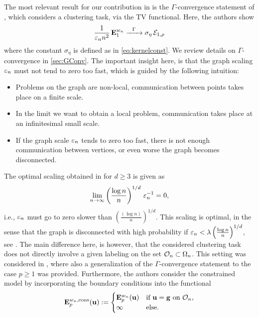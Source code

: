 The most relevant result for our contribution in \cite{roith2022continuum} is the $\Gamma$-convergence statement of \cite{GarcSlep15}, which considers a clustering task, via the TV functional. Here, the authors show 
%
\begin{align*}
\frac{1}{\varepsilon_n n^2}\, \mathbf{E}^{w_n}_1 \xrightarrow{\phantom{-}\Gamma\phantom{-}} \sigma_\eta\, \mathcal{E}_{1,\rho}
\end{align*}
%
where the constant $\sigma_\eta$ is defined as in \cref{eq:kernelconst}. We review details on $\Gamma$-convergence in \cref{sec:GConv}. The important insight here, is that the graph scaling $\varepsilon_n$ must not tend to zero too fast, which is guided by the following intuition:
%
\begin{itemize}
	\item Problems on the graph are non-local, communication between points takes place on a finite scale.
	\item In the limit we want to obtain a local problem, communication takes place at an infinitesimal small scale.
	\item If the graph scale $\varepsilon_n$ tends to zero too fast, there is not enough communication between vertices, or even worse the graph becomes disconnected.
\end{itemize}
%
The optimal scaling obtained in \cite{GarcSlep15} for $d\geq 3$ is given as 
%
\begin{align}\label{eq:garcscaling}
\lim_{n\to\infty} \left(\frac{\log n}{n}\right)^{1/d}\, \varepsilon_n^{-1} = 0,
\end{align}
%
i.e., $\varepsilon_n$ must go to zero slower than $\left(\frac{(\log n)}{n}\right)^{1/d}$. This scaling is optimal, in the sense that the graph is disconnected with high probability if $\varepsilon_n < \lambda \left(\frac{\log n}{n}\right)^{1/d}$, see \cite{GarcSlep15}. The main difference here, is however, that the considered clustering task does not directly involve a given labeling on the set $\mathcal{O}_n\subset\Omega_n$. This setting was considered in \cite{slepcev2019analysis}, where also a generalization of the $\Gamma$-convergence statement to the case $p\geq 1$ was provided. Furthermore, the authors consider the constrained  model by incorporating the boundary conditions into the functional
%
\begin{align*}
\mathbf{E}^{w_n, \text{cons}}_p(\mathbf{u}) :=
\begin{cases}
\mathbf{E}^{w_n}_p(\mathbf{u}) &\text{if } \mathbf{u} = \mathbf{g} \text{ on }\mathcal{O}_n,\\
\infty &\text{else}.
\end{cases} 
\end{align*}
